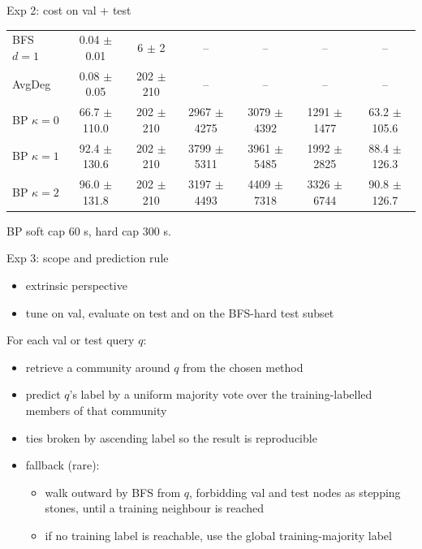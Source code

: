 \documentclass{beamer}
\begin{document}
\begin{frame}{Exp 2: cost on val + test}
\begin{center}
\begin{tabular}{lcccccc}
    BFS $d{=}1$              & 0.04 $\pm$ 0.01  & 6 $\pm$ 2     & --                 & --                  & --                  & --              \\
    AvgDeg                   & 0.08 $\pm$ 0.05  & 202 $\pm$ 210 & --                 & --                  & --                  & --              \\
    BP $\kappa{=}0$          & 66.7 $\pm$ 110.0 & 202 $\pm$ 210 & 2967 $\pm$ 4275    & 3079 $\pm$ 4392     & 1291 $\pm$ 1477     & 63.2 $\pm$ 105.6 \\
    BP $\kappa{=}1$          & 92.4 $\pm$ 130.6 & 202 $\pm$ 210 & 3799 $\pm$ 5311    & 3961 $\pm$ 5485     & 1992 $\pm$ 2825     & 88.4 $\pm$ 126.3 \\
    BP $\kappa{=}2$          & 96.0 $\pm$ 131.8 & 202 $\pm$ 210 & 3197 $\pm$ 4493    & 4409 $\pm$ 7318     & 3326 $\pm$ 6744     & 90.8 $\pm$ 126.7 \\
    \bottomrule
  \end{tabular}
  \end{center}

  \vfill

  \scriptsize BP soft cap $60$ s, hard cap $300$ s.
\end{frame}

\begin{frame}{Exp 3: scope and prediction rule}
  \begin{itemize}
    \item extrinsic perspective
    \item tune on val, evaluate on test and on the BFS-hard test
          subset
  \end{itemize}

  \vfill

  For each val or test query $q$:
  \begin{itemize}
    \item retrieve a community around $q$ from the chosen method
    \item predict $q$'s label by a uniform majority vote over the training-labelled members of that community
    \item ties broken by ascending label so the result is
          reproducible
    \item fallback (rare):
          \begin{itemize}
            \item walk outward by BFS from $q$, forbidding val and test nodes as stepping stones, until a training neighbour is reached
            \item if no training label is reachable, use the global training-majority label
          \end{itemize}
  \end{itemize}
\end{frame}
\end{document}
